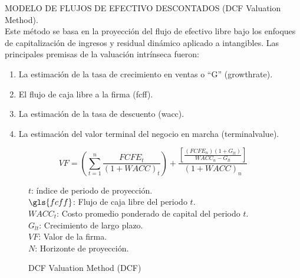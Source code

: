 \textcolor{principal}{MODELO DE FLUJOS DE EFECTIVO DESCONTADOS (DCF Valuation Method).}\\[5pt]

Este m\'etodo se basa en la proyecci\'on del flujo de efectivo libre bajo los enfoques de capitalizaci\'on de ingresos y residual din\'amico aplicado a intangibles. Las principales premisas de la valuaci\'on intr\'inseca fueron: 
\begin{enumerate}[1)]
\item La estimaci\'on de la tasa de crecimiento en ventas o ``G'' (\gls{growthrate}).
\item El flujo de caja libre a la firma (\gls{fcff}).
\item La estimaci\'on de la tasa de descuento (\gls{wacc}).
\item La estimaci\'on del valor terminal del negocio en marcha (\gls{terminalvalue}).


\end{enumerate}
%
\begin{figure}[H]
\centering
\caption{\textcolor{principal}{DCF Valuation Method (DCF)\label{fig:dcf}}}
$$VF=\left(\sum_{t=1}^n\frac{FCFE_t}{(1+WACC)_t}\right) + \frac{\left[\frac{(FCFE_n)(1+G_{lt})}{WACC_n-G_{lt}}\right]}{(1+WACC)_n}$$
\begin{minipage}{7cm}

\footnotesize
$t$: \'indice de periodo de proyecci\'on.\\
$\gls{fcff}$: Flujo de caja libre del periodo $t$.\\
$WACC_t$: Costo promedio ponderado de capital del periodo $t$.\\
$G_{lt}$: Crecimiento de largo plazo.\\
$VF$: Valor de la firma.\\
$N$: Horizonte de proyecci\'on.\\[10pt]

\end{minipage}
\end{figure}
